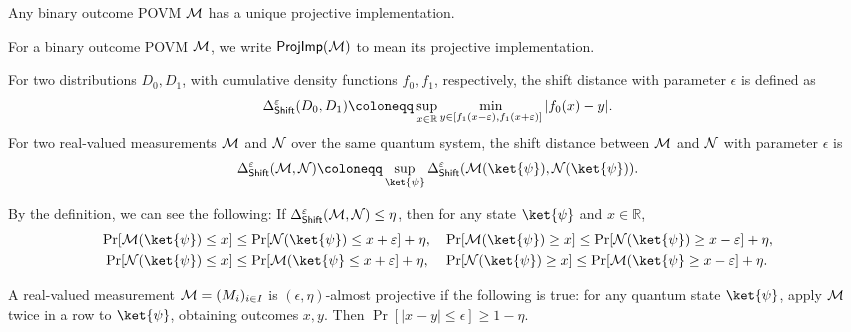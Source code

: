 \begin{lemma}
Any binary outcome POVM $\mathcal{M}$ has a unique projective implementation. 
\end{lemma} 
 

For a binary outcome POVM $\mathcal{M}$, 
we write $\mathsf{ProjImp}(\mathcal{M})$ to mean its projective implementation.

\begin{definition}\label{def:shift_distance}
For two distributions $D_0,D_1$, with cumulative density functions $f_0,f_1$, respectively, 
the shift distance with parameter $\epsilon$
is defined as
\begin{align*}
\shiftdis{\epsilon}(D_0,D_1) \coloneqq \sup_{x\in \mathbb{R}}\min_{y\in [f_1(x-\epsilon),f_1(x+\epsilon)]}|f_0(x)-y|.
\end{align*}
For two real-valued measurements $\mathcal{M}$ and $\mathcal{N}$ over the same quantum system, the shift distance between $\mathcal{M}$ and $\mathcal{N}$ with parameter $\epsilon$ is
\[
\shiftdis{\epsilon}(\mcal{M},\mcal{N}) \coloneqq  \sup_{\ket{\psi}}\shiftdis{\epsilon}(\mcal{M}(\ket{\psi}),\mcal{N}(\ket{\psi})).
\]
\end{definition}

By the definition, we can see the following: If $\Delta_{\mathsf{Shift}}^{\varepsilon}(\mathcal{M},\mathcal{N})\le \eta$, then for any state $\ket{\psi}$ and $x \in \mathbb{R}$, 
\begin{align*}
\Pr[\mcal{M}(\ket{\psi}) \le x] & \le \Pr[\mcal{N}(\ket{\psi})\le x + \epsilon] + \eta,&& \Pr[\mcal{M}(\ket{\psi}) \ge x]  \le \Pr[\mcal{N}(\ket{\psi})\ge x - \epsilon] + \eta,\\
\Pr[\mcal{N}(\ket{\psi})\le x] & \le \Pr[\mcal{M}(\ket{\psi}\le x + \epsilon] + \eta,&& \Pr[\mcal{N}(\ket{\psi})\ge x]  \le \Pr[\mcal{M}(\ket{\psi}\ge x - \epsilon] + \eta.
\end{align*}

\begin{definition}
A real-valued measurement $\mathcal{M}=(M_i)_{i\in I}$ is $(\epsilon,\eta)$-almost projective if the following is true: for any quantum state $\ket{\psi}$, apply $\mathcal{M}$ twice in a row to $\ket{\psi}$, obtaining outcomes $x,y$. Then $\Pr[|x-y|\le \epsilon]\ge 1-\eta$. 
\end{definition}

